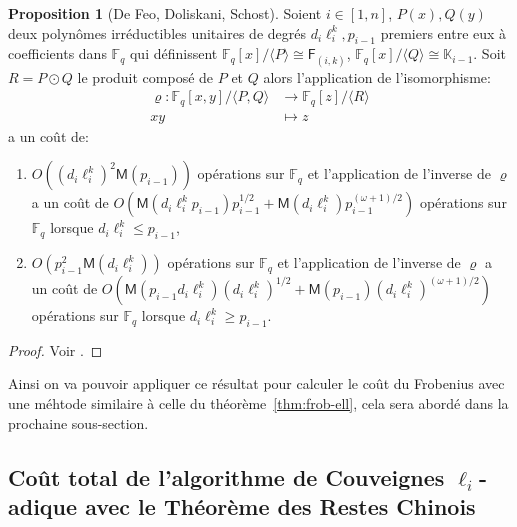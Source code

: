 \documentclass[10pt,a4paper]{book}
\theoremstyle{plain}
\theoremstyle{definition}
\theoremstyle{definition}
\theoremstyle{definition}
\newtheorem{prop}[thm]{Proposition}
\theoremstyle{definition}
\theoremstyle{remark}
\theoremstyle{remark}
\theoremstyle{definition}
\begin{document}
\begin{prop}[De Feo, Doliskani, Schost]
\label{pro:iso:fie}
Soient $i \in [1,n]$, $P(x),Q(y)$ deux polynômes irréductibles unitaires de degrés 
$d_i\ell_i^{k},p_{i-1}$ premiers entre eux à coefficients dans $\mathbb{F}_q$
qui définissent $\mathbb{F}_q[x]/\langle P \rangle \cong \mathsf{F}_{(i,k)}$,
$\mathbb{F}_q[x]/\langle Q \rangle \cong \mathbb{K}_{i-1}$. Soit $R=P \odot 
Q$ le produit composé de $P$ et $Q$ alors l'application de l'isomorphisme:
\begin{equation*}
\begin{alignedat}{1}
\varrho : \mathbb{F}_q[x,y]/\langle P, Q \rangle & \rightarrow \mathbb{F}_q[z]/\langle R \rangle \\
xy & \mapsto z
\end{alignedat}
\end{equation*}
a un coût de:
\begin{enumerate}
\item $O((d_i\ell_i^{k})^2\mathsf{M}(p_{i-1}))$ opérations sur $\mathbb{F}_q$
 et l'application de l'inverse de $\varrho$ a un coût de 
 $O(\mathsf{M}(d_i\ell_i^{k}p_{i-1})p_{i-1}^{1/2}+\mathsf{M}(d_i\ell_i^{k})p_{i-1}^{(\omega+1)/2})$ 
opérations sur $\mathbb{F}_q$ lorsque 
$d_i\ell_i^{k} \leqslant p_{i-1}$,
\item $O(p_{i-1}^2\mathsf{M}(d_i\ell_i^{k}))$ opérations sur $\mathbb{F}_q$ 
et l'application de l'inverse de $\varrho$ a un coût de 
$O(\mathsf{M}(p_{i-1}d_i\ell_i^{k})(d_i\ell_i^{k})^{1/2}+\mathsf{M}(p_{i-1})(d_i\ell_i^{k})^{(\omega+1)/2})$ 
opérations sur $\mathbb{F}_q$ lorsque $d_i\ell_i^{k} \geqslant p_{i-1}$.
\end{enumerate}
\end{prop}

\begin{proof}
Voir \cite{DeFeoDoliskaniSchost14}.
\end{proof}

Ainsi on va pouvoir appliquer ce résultat pour calculer le coût du Frobenius 
avec une méhtode similaire à celle du théorème~\ref{thm:frob-ell}, cela sera 
abordé dans la prochaine sous-section.

\subsection{Coût total de l'algorithme de Couveignes $\ell_i$-adique avec le Théorème des Restes Chinois}
\end{document}

